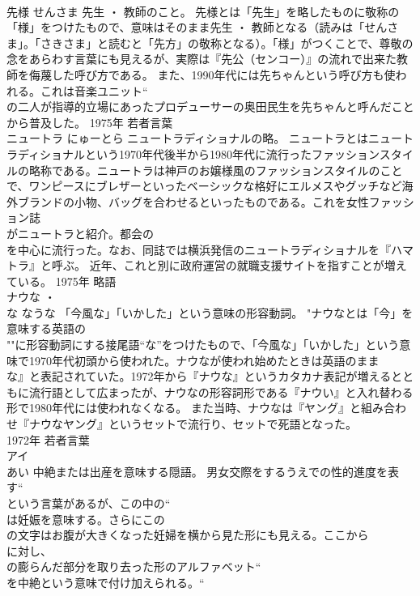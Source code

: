 \documentclass[8pt]{extreport}
\begin{document}
\begin{CJK}{UTF8}{min}
\\	先様	せんさま	先生 ・ 教師のこと。	先様とは「先生」を略したものに敬称の「様」をつけたもので、意味はそのまま先生 ・ 教師となる（読みは「せんさま」。「さきさま」と読むと「先方」の敬称となる）。「様」がつくことで、尊敬の念をあらわす言葉にも見えるが、実際は『先公（センコー）』の流れで出来た教師を侮蔑した呼び方である。 また、1990年代には先ちゃんという呼び方も使われる。これは音楽ユニット“
\\	の二人が指導的立場にあったプロデューサーの奥田民生を先ちゃんと呼んだことから普及した。	1975年	若者言葉	
\\	ニュートラ	にゅーとら	ニュートラディショナルの略。	ニュートラとはニュートラディショナルという1970年代後半から1980年代に流行ったファッションスタイルの略称である。ニュートラは神戸のお嬢様風のファッションスタイルのことで、ワンピースにブレザーといったベーシックな格好にエルメスやグッチなど海外ブランドの小物、バッグを合わせるといったものである。これを女性ファッション誌
\\	がニュートラと紹介。都会の
\\	を中心に流行った。なお、同誌では横浜発信のニュートラディショナルを『ハマトラ』と呼ぶ。 近年、これと別に政府運営の就職支援サイトを指すことが増えている。	1975年	略語	
\\	ナウな ・ 
\\	な	なうな	「今風な」「いかした」という意味の形容動詞。	"ナウなとは「今」を意味する英語の
\\	""に形容動詞にする接尾語“な”をつけたもので、「今風な」「いかした」という意味で1970年代初頭から使われた。ナウなが使われ始めたときは英語のまま
\\	な』と表記されていた。1972年から『ナウな』というカタカナ表記が増えるとともに流行語として広まったが、ナウなの形容詞形である『ナウい』と入れ替わる形で1980年代には使われなくなる。 また当時、ナウなは『ヤング』と組み合わせ『ナウなヤング』というセットで流行り、セットで死語となった。
\\	1972年	若者言葉	
\\	アイ
\\	あい	中絶または出産を意味する隠語。	男女交際をするうえでの性的進度を表す“
\\	という言葉があるが、この中の“
\\	は妊娠を意味する。さらにこの
\\	の文字はお腹が大きくなった妊婦を横から見た形にも見える。ここから
\\	に対し、
\\	の膨らんだ部分を取り去った形のアルファベット“
\\	を中絶という意味で付け加えられる。“

\end{CJK}
\end{document}

